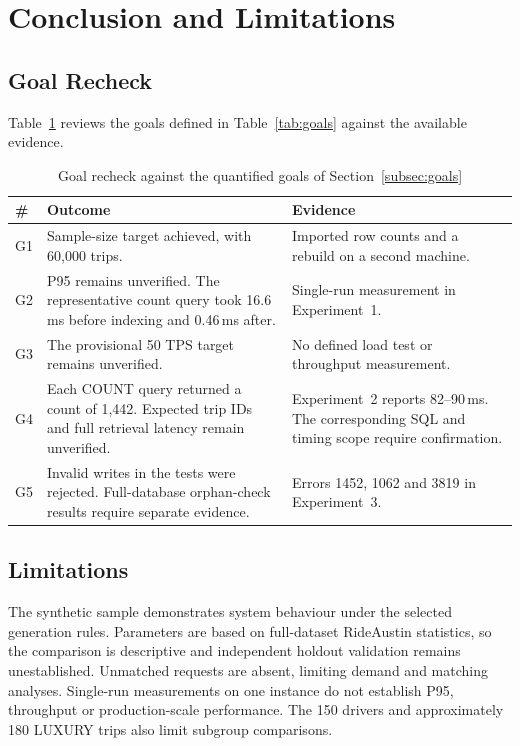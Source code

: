 \section{Conclusion and Limitations}
\label{sec:conclusion}

\subsection{Goal Recheck}
Table~\ref{tab:goalcheck} reviews the goals defined in Table~\ref{tab:goals} against the available evidence.

\begin{table}[H]  %
\centering
\caption{Goal recheck against the quantified goals of Section~\ref{subsec:goals}}
\label{tab:goalcheck}
\small
\begin{tabular}{@{}lp{7.0cm}p{6.5cm}@{}}
\toprule
\# & Outcome & Evidence \\
\midrule
G1 & Sample-size target achieved, with 60{,}000 trips. & Imported row counts and a rebuild on a second machine. \\
G2 & P95 remains unverified. The representative count query took 16.6\,ms before indexing and 0.46\,ms after. & Single-run measurement in Experiment~1. \\
G3 & The provisional 50 TPS target remains unverified. & No defined load test or throughput measurement. \\
G4 & Each COUNT query returned a count of 1{,}442. Expected trip IDs and full retrieval latency remain unverified. & Experiment~2 reports 82--90\,ms. The corresponding SQL and timing scope require confirmation. \\
G5 & Invalid writes in the tests were rejected. Full-database orphan-check results require separate evidence. & Errors 1452, 1062 and 3819 in Experiment~3. \\
\bottomrule
\end{tabular}
\end{table}

\subsection{Limitations}
The synthetic sample demonstrates system behaviour under the selected generation rules. Parameters are based on full-dataset RideAustin statistics, so the comparison is descriptive and independent holdout validation remains unestablished. Unmatched requests are absent, limiting demand and matching analyses. Single-run measurements on one instance do not establish P95, throughput or production-scale performance. The 150 drivers and approximately 180 LUXURY trips also limit subgroup comparisons.

